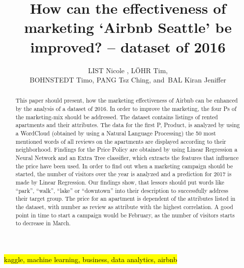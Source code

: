 \documentclass[journal]{IEEEtran}
\begin{document}
    \title{How can the effectiveness of marketing ‘Airbnb Seattle’ be improved?
– dataset of 2016 
}
  \author{LIST Nicole ,
      L\"OHR Tim,\\
      BOHNSTEDT Timo,
      PANG Tsz Ching,
      and~BAL Kiran Jeniffer%
}



\maketitle
\begin{abstract}
This paper should present, how the marketing effectiveness of Airbnb can be enhanced by the analysis of a dataset of 2016. In order to improve the marketing, the four Ps of the marketing-mix should be addressed. The dataset contains listings of rented apartments and their attributes. The data for the first P, Product, is analyzed by using a WordCloud (obtained by using a Natural Language Processing) the 50 most mentioned words of all reviews on the apartments are displayed according to their neighborhood. Findings for the Price Policy are obtained by using Linear Regression a Neural Network and an Extra Tree classifier, which extracts the features that influence the price have been used. In order to find out when a marketing campaign should be started, the number of visitors over the year is analyzed and a prediction for 2017 is made by Linear Regression. Our findings show, that lessors should put words like “park”, “walk”, “lake” or “downtown” into their description to successfully address their target group. The price for an apartment is dependent of the attributes listed in the dataset, with number as review as attribute with the highest correlation. A good point in time to start a campaign would be February, as the number of visitors starts to decrease in March.
\end{abstract}

\begin{IEEEkeywords}
\hl{kaggle, machine learning, business, data analytics, airbnb}
\end{IEEEkeywords}

\IEEEpeerreviewmaketitle

\end{document}
